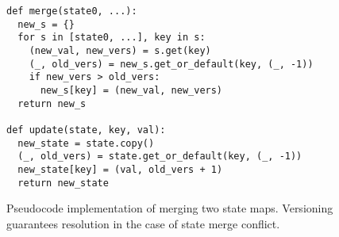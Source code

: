 \begin{figure}
\begin{verbatim}
def merge(state0, ...):
  new_s = {}
  for s in [state0, ...], key in s:
    (new_val, new_vers) = s.get(key)
    (_, old_vers) = new_s.get_or_default(key, (_, -1))
    if new_vers > old_vers:
      new_s[key] = (new_val, new_vers)
  return new_s

def update(state, key, val):
  new_state = state.copy()
  (_, old_vers) = state.get_or_default(key, (_, -1))
  new_state[key] = (val, old_vers + 1)
  return new_state
\end{verbatim}
    \caption{
Pseudocode implementation
  of merging two state
  maps.
Versioning guarantees
  resolution in the case
  of state merge conflict.
}

    \label{fig:state-merge-and-update}
\end{figure}